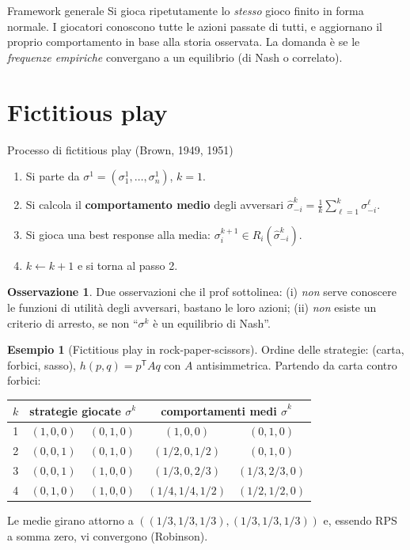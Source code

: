 \documentclass[12pt,a4paper,twoside]{book}
\theoremstyle{plain}
\theoremstyle{definition}
\newtheorem{example}[theorem]{Esempio}
\newtheorem{remark}[theorem]{Osservazione}
\begin{document}
\begin{defbox}{Framework generale}
Si gioca ripetutamente lo \emph{stesso} gioco finito in forma normale. I giocatori
conoscono tutte le azioni passate di tutti, e aggiornano il proprio comportamento
in base alla storia osservata. La domanda è se le \emph{frequenze empiriche}
convergano a un equilibrio (di Nash o correlato).
\end{defbox}

\section{Fictitious play}

\begin{defbox}{Processo di fictitious play (Brown, 1949, 1951)}
\begin{enumerate}[leftmargin=*]
  \item Si parte da $\sigma^1=(\sigma^1_1,\dots,\sigma^1_n)$, $k=1$.
  \item Si calcola il \textbf{comportamento medio} degli avversari
        $\hat\sigma^k_{-i}=\frac{1}{k}\sum_{\ell=1}^{k}\sigma^\ell_{-i}$.
  \item Si gioca una best response alla media:
        $\sigma^{k+1}_i\in R_i(\hat\sigma^k_{-i})$.
  \item $k\leftarrow k+1$ e si torna al passo 2.
\end{enumerate}
\end{defbox}

\begin{remark}
Due osservazioni che il prof sottolinea: (i) \emph{non} serve conoscere le funzioni
di utilità degli avversari, bastano le loro azioni; (ii) \emph{non} esiste un
criterio di arresto, se non ``$\sigma^k$ è un equilibrio di Nash''.
\end{remark}

\begin{example}[Fictitious play in rock-paper-scissors]
Ordine delle strategie: (carta, forbici, sasso), $h(p,q)=p^{\mathsf T}Aq$ con
$A$ antisimmetrica. Partendo da carta contro forbici:
\begin{center}
\begin{tabular}{c|cc|cc}
$k$ & \multicolumn{2}{c|}{strategie giocate $\sigma^k$} & \multicolumn{2}{c}{comportamenti medi $\hat\sigma^k$}\\\hline
1 & $(1,0,0)$ & $(0,1,0)$ & $(1,0,0)$ & $(0,1,0)$\\
2 & $(0,0,1)$ & $(0,1,0)$ & $(1/2,0,1/2)$ & $(0,1,0)$\\
3 & $(0,0,1)$ & $(1,0,0)$ & $(1/3,0,2/3)$ & $(1/3,2/3,0)$\\
4 & $(0,1,0)$ & $(1,0,0)$ & $(1/4,1/4,1/2)$ & $(1/2,1/2,0)$\\
\end{tabular}
\end{center}
Le medie girano attorno a $((1/3,1/3,1/3),(1/3,1/3,1/3))$ e, essendo RPS a somma
zero, vi convergono (Robinson).
\end{example}
\end{document}
